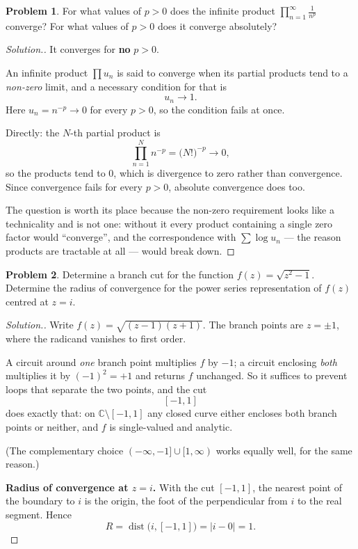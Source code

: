 \documentclass[11pt,a4paper]{article}
\theoremstyle{definition}
\newtheorem{problemx}{Problem}[section]
\newenvironment{problem}{\begin{problemx}}{\end{problemx}}
\newenvironment{solution}
  {\renewcommand{\qedsymbol}{}\begin{proof}[\textit{Solution}.]}
  {\end{proof}}
\begin{document}
\begin{problem}
For what values of $p > 0$ does the infinite product
$\displaystyle\prod^{\infty}_{n = 1}\frac{1}{n^{p}}$ converge? For what values
of $p > 0$ does it converge absolutely?
\end{problem}

\begin{solution}
It converges for \textbf{no} $p > 0$.

An infinite product $\prod u_n$ is said to converge when its partial products tend
to a \emph{non-zero} limit, and a necessary condition for that is
$$u_n \longrightarrow 1 .$$
Here $u_n = n^{-p} \rightarrow 0$ for every $p > 0$, so the condition fails at
once.

Directly: the $N$-th partial product is
$$\prod^{N}_{n=1} n^{-p} = \big(N!\big)^{-p} \longrightarrow 0 ,$$
so the products tend to $0$, which is divergence to zero rather than convergence.
Since convergence fails for every $p>0$, absolute convergence does too.

The question is worth its place because the non-zero requirement looks like a
technicality and is not one: without it every product containing a single zero
factor would ``converge'', and the correspondence with $\sum \log u_n$ --- the
reason products are tractable at all --- would break down.
\end{solution}


\begin{problem}
Determine a branch cut for the function $f(z) = \sqrt{z^{2} - 1}$. Determine the
radius of convergence for the power series representation of $f(z)$ centred at
$z = i$.
\end{problem}

\begin{solution}
Write $f(z) = \sqrt{(z-1)(z+1)}$. The branch points are $z = \pm 1$, where the
radicand vanishes to first order.

A circuit around \emph{one} branch point multiplies $f$ by $-1$; a circuit
enclosing \emph{both} multiplies it by $(-1)^2 = +1$ and returns $f$ unchanged. So
it suffices to prevent loops that separate the two points, and the cut
$$[-1, 1]$$
does exactly that: on $\mathbb{C}\setminus[-1,1]$ any closed curve either encloses
both branch points or neither, and $f$ is single-valued and analytic.

(The complementary choice $(-\infty,-1] \cup [1,\infty)$ works equally well, for
the same reason.)

\textbf{Radius of convergence at $z = i$.} With the cut $[-1,1]$, the nearest
point of the boundary to $i$ is the origin, the foot of the perpendicular from
$i$ to the real segment. Hence
$$R = \operatorname{dist}\big(i, [-1,1]\big) = \left|i - 0\right| = 1 .$$
\end{solution}
\end{document}
